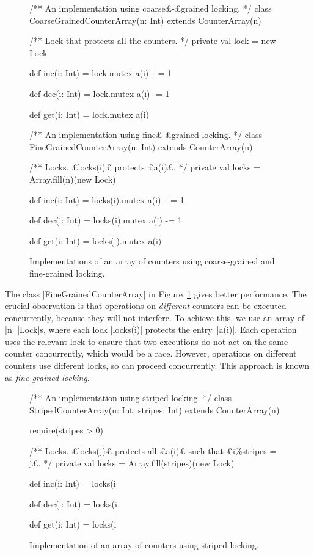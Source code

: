 \begin{figure}
\begin{scala}
/** An implementation using coarse£-£grained locking. */
class CoarseGrainedCounterArray(n: Int) extends CounterArray(n){
  /** Lock that protects all the counters. */
  private val lock = new Lock

  def inc(i: Int) = lock.mutex{ a(i) += 1 }

  def dec(i: Int) = lock.mutex{ a(i) -= 1 }

  def get(i: Int) = lock.mutex{ a(i) }
}

/** An implementation using fine£-£grained locking. */
class FineGrainedCounterArray(n: Int) extends CounterArray(n){
  /** Locks.  £locks(i)£ protects £a(i)£. */
  private val locks = Array.fill(n)(new Lock)

  def inc(i: Int) = locks(i).mutex{ a(i) += 1 }

  def dec(i: Int) = locks(i).mutex{ a(i) -= 1 }

  def get(i: Int) = locks(i).mutex{ a(i) }
}

\end{scala}
\caption{Implementations of an array of counters using coarse-grained and
  fine-grained locking.}
\label{fig:CoarseGrainedCounterArray}
\label{fig:FineGrainedCounterArray}
\end{figure}


The class |FineGrainedCounterArray| in
Figure~\ref{fig:FineGrainedCounterArray} gives better performance.  The
crucial observation is that operations on \emph{different} counters can be
executed concurrently, because they will not interfere.  To achieve this, we
use an array of |n| |Lock|s, where each lock |locks(i)| protects the
entry~|a(i)|.  Each operation uses the relevant lock to ensure that two
executions do not act on the same counter concurrently, which would be a race.
However, operations on different counters use different locks, so can proceed
concurrently.  This approach is known as \emph{fine-grained locking}.


\begin{figure}
\begin{scala}
/** An implementation using striped locking. */
class StripedCounterArray(n: Int, stripes: Int) extends CounterArray(n){
  require(stripes > 0)

  /** Locks.  £locks(j)£ protects all £a(i)£ such that £i\%stripes = j£. */
  private val locks = Array.fill(stripes)(new Lock)

  def inc(i: Int) = locks(i%

  def dec(i: Int) = locks(i%

  def get(i: Int) = locks(i%
}
\end{scala}
\caption{Implementation of an array of counters using  striped locking.}
\label{fig:StripedCounterArray}
\end{figure}

